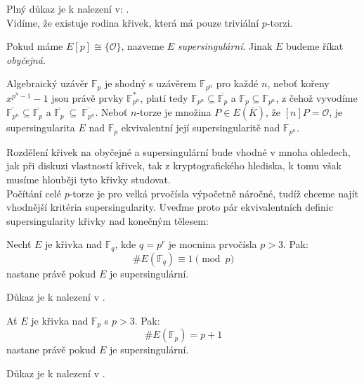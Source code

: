 \documentclass [12pt]{report}
\begin{document}
Plný důkaz je k nalezení v: \cite[Cor. III.6.4]{SilvermanArithm}.\\

Vidíme, že existuje rodina křivek, která má pouze triviální $p$-torzi.

\begin{definice}
Pokud máme $E[p] \cong \lbrace \mathcal{O} \rbrace $, nazveme $E$ \textit{supersingulární}. Jinak $E$ budeme říkat \textit{obyčejná}.
\end{definice}

\begin{poznamka}\label{uzaver}
Algebraický uzávěr $\mathbb{F}_p$ je shodný s uzávěrem $\mathbb{F}_{p^n}$ pro každé $n$, neboť kořeny $x^{p^n-1}-1$ jsou právě prvky $\mathbb{F}_{p^n}^*$, platí tedy $\mathbb{F}_{p^n} \subseteq \overline{\mathbb{F}_p}$ a $\mathbb{F}_p \subseteq \mathbb{F}_{p^n}$, z čehož vyvodíme  $\overline{\mathbb{F}_{p^n}} \subseteq \overline{\mathbb{F}_p}$ a $\overline{\mathbb{F}_p }~\subseteq ~\overline{\mathbb{F}_{p^n}}$. Neboť $n$-torze je množina $P \in E(\overline{K})$, že $[n]P = \mathcal{O}$, je supersingularita $E$ nad $\mathbb{F}_p$ ekvivalentní její supersingularitě nad $\mathbb{F}_{p^n}$.
\end{poznamka}

Rozdělení křivek na obyčejné a supersingulární bude vhodné v mnoha ohledech, jak při diskuzi vlastností křivek, tak z kryptografického hlediska, k tomu však musíme hlouběji tyto křivky studovat.\\

Počítání celé $p$-torze je pro velká prvočísla výpočetně náročné, tudíž chceme najít vhodnější kritéria supersingularity. Uveďme proto pár ekvivalentních definic supersingularity křivky nad konečným tělesem:

\begin{veta}\label{super}
Nechť $E$ je křivka nad $\mathbb{F}_q$, kde $q = p^r$ je mocnina prvočísla $p > 3$. Pak: $$\# E(\mathbb{F}_q) \equiv 1 \pmod{p}$$  nastane právě pokud $E$ je supersingulární.
\end{veta}

Důkaz je k nalezení v \cite[Prop.~4.31]{Washington}. 

\begin{veta}\label{super2}
Ať $E$ je křivka nad $\mathbb{F}_p$ s $p > 3$. Pak: $$\# E(\mathbb{F}_p) = p+1$$  nastane právě pokud $E$ je supersingulární.
\end{veta}

Důkaz je k nalezení v \cite[Cor.~4.32]{Washington}.\\
\end{document}
